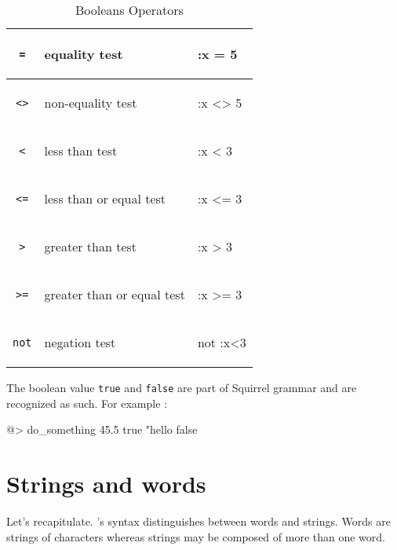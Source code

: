 \begin{table}[ht]
\begin{center}
\begin{tabular}{|c|l|l|}
\hline
\verb+=+\index{\verb+=+} & equality test & \begin{tt}:x = 5\end{tt}\\
\hline
\verb+<>+\index{\verb+<>+} & non-equality test & \begin{tt} :x <> 5 \end{tt}\\
\hline
\verb+<+\index{\verb+<+} & less than test & \begin{tt}:x < 3\end{tt}\\
\hline
\verb+<=+\index{\verb+<=+} & less than or equal test & \begin{tt}:x <= 3\end{tt}\\
\hline
\verb+>+\index{\verb+>+} & greater than test & \begin{tt}:x > 3\end{tt}\\
\hline
\verb+>=+\index{\verb+>=+} & greater than or equal test & \begin{tt}:x >= 3\end{tt}\\
\hline
\verb+not+\index{\verb+not+} & negation test & \begin{tt}not :x<3\end{tt}\\
\hline
\end{tabular}
\end{center}
\caption{Booleans Operators}
\end{table}

The boolean value {\tt true} and {\tt false} are part of Squirrel grammar and
are recognized as such. For example :

\begin{verbatimtab} 
@> do_something 45.5 true "hello false
\end{verbatimtab}
 
\section{Strings and words} 

Let's recapitulate.  \squirrel's syntax distinguishes between words and strings.  Words are strings of characters whereas strings may be composed of more than one word.   
 
